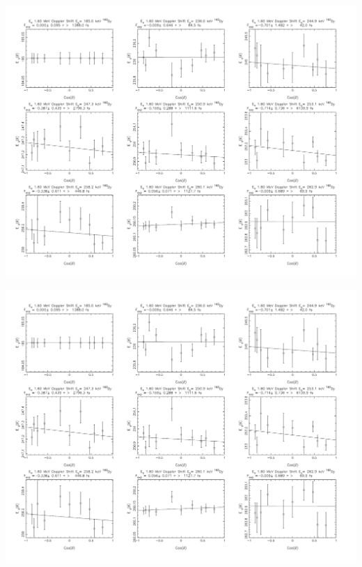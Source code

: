 \begin{center}
\includegraphics[page=2,angle=90,height=0.95\textheight]{162Dy_ftau_160_n.pdf}
\end{center}

\begin{center}
\includegraphics[page=3,angle=90,height=0.95\textheight]{162Dy_ftau_160_n.pdf}
\end{center}

